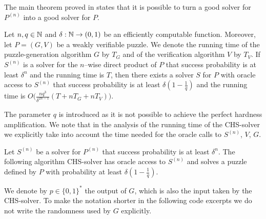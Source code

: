 The main theorem proved in \cite{canetti2004hardness} states that it is possible to turn a good solver for $P^{(n)}$
into a good solver for $P$.
%
\begin{theorem}
  \label{thm:wvp_chs}
Let $n,q \in \mathbb{N}$ and $\delta: \mathbb{N} \rightarrow (0,1)$ be an efficiently computable function.
Moreover, let $P = (G,V)$ be a weakly verifiable puzzle. We denote the running time of the
puzzle-generation algorithm $G$ by $T_G$ and of the verification algorithm $V$ by $T_V$.
If $S^{(n)}$ is a solver for the $n$--wise direct product of $P$ that success probability is at least $\delta^{n}$
and the running time is $T$, then there exists a solver $S$ for $P$ with oracle access to $S^{(n)}$ that success
probability is at least $\delta(1-\frac{1}{q})$ and the running time is $O\Big(\frac{nq^3}{\delta^{2n-1}}(T + nT_G + nT_V)\Big)$.
\end{theorem}
%
The parameter $q$ is introduced as it is not possible to achieve
the perfect hardness amplification. We note that in the analysis of
the running time of the CHS-solver we explicitly take into account the time needed for the oracle calls to $S^{(n)}$, $V$, $G$.

Let $S^{(n)}$ be a solver for $P^{(n)}$ that success probability is at least $\delta^{n}$.
The following algorithm CHS-solver has oracle access to $S^{(n)}$ and
solves a puzzle defined by $P$ with probability at least $\delta(1  - \frac{1}{q})$.

We denote by $p \in \{0,1\}^{*}$ the output of $G$, which is also the input taken by the CHS-solver.
To make the notation shorter in the following code excerpts we do not write the randomness used by $G$ explicitly.

